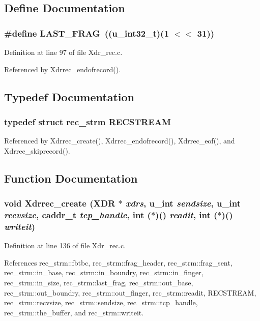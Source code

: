 \subsection{Define Documentation}
\subsubsection{\setlength{\rightskip}{0pt plus 5cm}\#define LAST\_\-FRAG\ ((u\_\-int32\_\-t)(1 $<$$<$ 31))}\label{Xdr__rec_8c_a0}




Definition at line 97 of file Xdr\_\-rec.c.

Referenced by Xdrrec\_\-endofrecord().

\subsection{Typedef Documentation}
\subsubsection{\setlength{\rightskip}{0pt plus 5cm}typedef struct {\bf rec\_\-strm}  {\bf RECSTREAM}}\label{Xdr__rec_8c_a2}




Referenced by Xdrrec\_\-create(), Xdrrec\_\-endofrecord(), Xdrrec\_\-eof(), and Xdrrec\_\-skiprecord().

\subsection{Function Documentation}
\subsubsection{\setlength{\rightskip}{0pt plus 5cm}void Xdrrec\_\-create (XDR $\ast$ {\em xdrs}, u\_\-int {\em sendsize}, u\_\-int {\em recvsize}, caddr\_\-t {\em tcp\_\-handle}, int ($\ast$)() {\em readit}, int ($\ast$)() {\em writeit})}\label{Xdr__rec_8c_a16}




Definition at line 136 of file Xdr\_\-rec.c.

References rec\_\-strm::fbtbc, rec\_\-strm::frag\_\-header, rec\_\-strm::frag\_\-sent, rec\_\-strm::in\_\-base, rec\_\-strm::in\_\-boundry, rec\_\-strm::in\_\-finger, rec\_\-strm::in\_\-size, rec\_\-strm::last\_\-frag, rec\_\-strm::out\_\-base, rec\_\-strm::out\_\-boundry, rec\_\-strm::out\_\-finger, rec\_\-strm::readit, RECSTREAM, rec\_\-strm::recvsize, rec\_\-strm::sendsize, rec\_\-strm::tcp\_\-handle, rec\_\-strm::the\_\-buffer, and rec\_\-strm::writeit.

